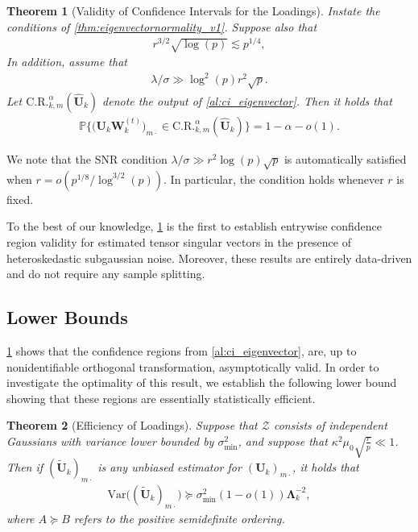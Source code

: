 \documentclass[10pt]{article}
\newcommand{\0}{{\mathbf{0}}}
\newcommand{\1}{{\mathbf{1}}}
\newcommand{\U}{{\mathbf{U}}}
\newcommand{\uhat}{\mathbf{\hat{U}}}
\newtheorem{theorem}{Theorem}
\newcommand{\p}{\mathbb{P}}
\renewcommand{\tilde}{\widetilde}
\renewcommand{\hat}{\widehat}
\renewcommand{\hat}{\widehat}
\begin{document}
 \begin{theorem}[Validity of Confidence Intervals for the Loadings]\label{thm:civalidity2_v1}  Instate the conditions of \cref{thm:eigenvectornormality_v1}.  Suppose also that 
 \begin{align}
     r^{3/2}\sqrt{\log(p)} \lesssim p^{1/4}, \label{technicalcondition}
 \end{align}
 In addition, assume that %
 \begin{align*}
     \lambda/\sigma \gg \log^2(p) r^2 \sqrt{p}.
 \end{align*}
Let $\mathrm{C.R.}_{k,m}^{\alpha}(\uhat_k)$ denote the output of \cref{al:ci_eigenvector}.  Then it holds that
 \begin{align*}
   \p\bigg\{ \bigg( \U_k \mathbf{W}_k^{(t)}\bigg)_{m\cdot}  \in  \mathrm{C.R.}_{k,m}^{\alpha}(\uhat_k) \bigg\} = 1- \alpha  - o(1).
 \end{align*}
   \end{theorem}
 
 We note that the SNR condition $\lambda/\sigma \gg  r^2 \log(p) \sqrt{p}$ is automatically satisfied when  $r = o(p^{1/8}/\log^{3/2}(p))$.  In particular, the condition holds whenever  $r$ is fixed.  
 
 To the best of our knowledge, \cref{thm:civalidity2_v1} is the first to establish entrywise confidence region validity for estimated tensor singular vectors in the presence of heteroskedastic subgaussian noise.  Moreover, these results are entirely data-driven and do not require any sample splitting.
  
  
  
  

  
\subsection{Lower Bounds}
\label{sec:loadingslowerbounds}
   \cref{thm:civalidity2_v1} shows that the confidence regions from \cref{al:ci_eigenvector}, are, up to nonidentifiable orthogonal transformation, asymptotically valid.    In order to investigate the optimality of this result, we establish the following  lower bound showing that these regions are essentially statistically efficient.
 
 \begin{theorem}[Efficiency of Loadings] \label{thm:efficiencyloadings}
 Suppose that $\mathcal{Z}$ consists of independent Gaussians with variance lower bounded by $\sigma_{\min}^2$, and suppose that $\kappa^2 \mu_0 \sqrt{\frac{r}{p}} \ll 1$.  Then if $( \mathbf{\tilde \U}_k)_{m\cdot}$ is any unbiased estimator for $(\U_k)_{m\cdot}$, it holds that
 \begin{align*}
     \mathrm{Var}\big( (\mathbf{\tilde \U}_k)_{m\cdot} \big) \succcurlyeq \sigma_{\min}^2 (1- o(1)) \mathbf{\Lambda}_k^{-2},
 \end{align*}
 where $A \succcurlyeq B$ refers to the positive semidefinite ordering.
 \end{theorem}
 
\end{document}
